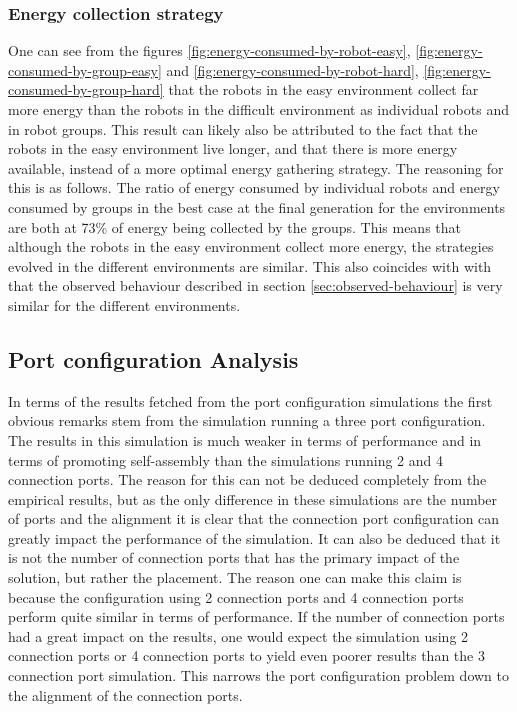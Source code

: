 \subsubsection{Energy collection strategy}
One can see from the figures \ref{fig:energy-consumed-by-robot-easy}, \ref{fig:energy-consumed-by-group-easy} and \ref{fig:energy-consumed-by-robot-hard}, \ref{fig:energy-consumed-by-group-hard} that the robots in the easy environment collect far more energy than the robots in the difficult environment as individual robots and in robot groups.
This result can likely also be attributed to the fact that the robots in the easy environment live longer, and that there is more energy available, instead of a more optimal energy gathering strategy.
The reasoning for this is as follows.
The ratio of energy consumed by individual robots and energy consumed by groups in the best case at the final generation for the environments are both at 73\% of energy being collected by the groups.
This means that although the robots in the easy environment collect more energy, the strategies evolved in the different environments are similar.
This also coincides with with that the observed behaviour described in section \ref{sec:observed-behaviour} is very similar for the different environments.



\subsection{Port configuration Analysis}
In terms of the results fetched from the port configuration simulations the first obvious remarks stem from the simulation running a three port configuration.
The results in this simulation is much weaker in terms of performance and in terms of promoting self-assembly than the simulations running 2 and 4 connection ports.
The reason for this can not be deduced completely from the empirical results, but as the only difference in these simulations are the number of ports and the alignment it is clear that the connection port configuration can greatly impact the performance of the simulation.
It can also be deduced that it is not the number of connection ports that has the primary impact of the solution, but rather the placement.
The reason one can make this claim is because the configuration using 2 connection ports and 4 connection ports perform quite similar in terms of performance.
If the number of connection ports had a great impact on the results, one would expect the simulation using 2 connection ports or 4 connection ports to yield even poorer results than the 3 connection port simulation.
This narrows the port configuration problem down to the alignment of the connection ports.

